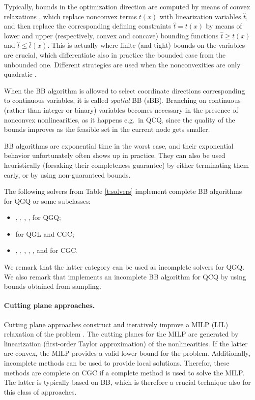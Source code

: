 Typically, bounds in the optimization direction are computed by means of convex relaxations \cite{mccormick,BeLeLiMaWa08}, which replace nonconvex terms $t(x)$ with linearization variables $\hat{t}$, and then replace the corresponding defining constraints $\hat{t} = t(x)$ by means of lower and upper (respectively, convex and concave) bounding functions $\hat{t} \ge \underline{t}(x)$ and $\hat{t} \le\bar{t}(x)$. This is actually where finite (and tight) bounds on the variables are crucial, which differentiate also in practice the bounded case from the unbounded one. Different strategies are used when the nonconvexities are only quadratic \cite{MiFl13,bliek}.

When the BB algorithm is allowed to select coordinate directions corresponding to continuous variables, it is called \emph{spatial} BB (sBB). Branching on continuous (rather than integer or binary) variables becomes necessary in the presence of nonconvex nonlinearities, as it happens e.g.~in QCQ, since the quality of the bounds improves as the feasible set in the current node gets smaller.

BB algorithms are exponential time in the worst case, and their exponential behavior unfortunately often shows up in practice. They can also be used heuristically (forsaking their completeness guarantee) by either terminating them early, or by using non-guaranteed bounds.

The following solvers from Table \ref{t:solvers} implement complete BB algorithms for QGQ or some subclasses:
%
\begin{itemize}
 \item \antigone, \baron, \couenne, \lindo, \scip for QGQ;
\item \cplex for QGL and CGC;
%
 \item \knitro, \bonmin, \sbb, \xpress, \gurobi, and \mosek for CGC.
\end{itemize}
%
We remark that the latter category can be used as incomplete solvers for QGQ. %
We also remark that \lgo implements an incomplete BB algorithm for QCQ by using bounds obtained from sampling.

\paragraph{Cutting plane approaches.}
%
Cutting plane approaches construct and iteratively improve a MILP (LIL) relaxation of the problem \cite{DuGr86,WePoe02}. The cutting planes for the MILP are generated by linearization (first-order Taylor approximation) of the nonlinearities. If the latter are convex, the MILP provides a valid lower bound for the problem. Additionally, incomplete methods can be used to provide local solutions. Therefor, these methods are complete on CGC if a complete method is used to solve the MILP. The latter is typically based on BB, which is therefore a crucial technique also for this class of approaches.

